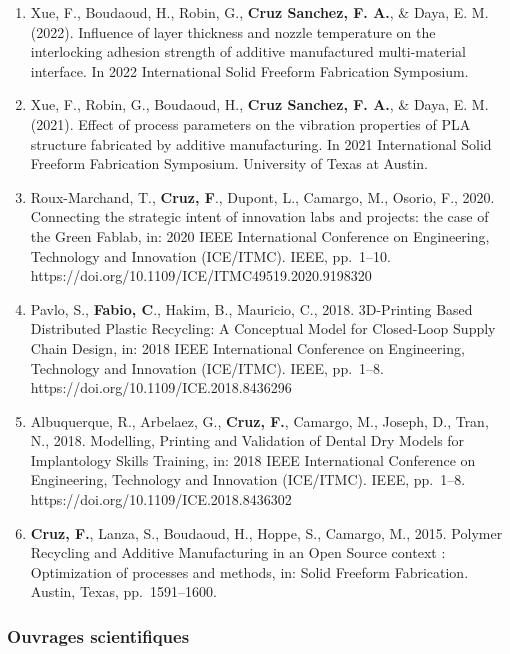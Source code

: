\documentclass[
  11pt,
]{article}
\begin{document}
\begin{enumerate}
\def\labelenumi{\arabic{enumi}.}
\item
  Xue, F., Boudaoud, H., Robin, G., \textbf{Cruz Sanchez, F. A.}, \&
  Daya, E. M. (2022). Influence of layer thickness and nozzle
  temperature on the interlocking adhesion strength of additive
  manufactured multi-material interface. In 2022 International Solid
  Freeform Fabrication Symposium.
\item
  Xue, F., Robin, G., Boudaoud, H., \textbf{Cruz Sanchez, F. A.}, \&
  Daya, E. M. (2021). Effect of process parameters on the vibration
  properties of PLA structure fabricated by additive manufacturing. In
  2021 International Solid Freeform Fabrication Symposium. University of
  Texas at Austin.
\item
  Roux-Marchand, T., \textbf{Cruz, F}., Dupont, L., Camargo, M., Osorio,
  F., 2020. Connecting the strategic intent of innovation labs and
  projects: the case of the Green Fablab, in: 2020 IEEE International
  Conference on Engineering, Technology and Innovation (ICE/ITMC). IEEE,
  pp.~1--10. https://doi.org/10.1109/ICE/ITMC49519.2020.9198320
\item
  Pavlo, S., \textbf{Fabio, C}., Hakim, B., Mauricio, C., 2018.
  3D-Printing Based Distributed Plastic Recycling: A Conceptual Model
  for Closed-Loop Supply Chain Design, in: 2018 IEEE International
  Conference on Engineering, Technology and Innovation (ICE/ITMC). IEEE,
  pp.~1--8. https://doi.org/10.1109/ICE.2018.8436296
\item
  Albuquerque, R., Arbelaez, G., \textbf{Cruz, F.}, Camargo, M., Joseph,
  D., Tran, N., 2018. Modelling, Printing and Validation of Dental Dry
  Models for Implantology Skills Training, in: 2018 IEEE International
  Conference on Engineering, Technology and Innovation (ICE/ITMC). IEEE,
  pp.~1--8. https://doi.org/10.1109/ICE.2018.8436302
\item
  \textbf{Cruz, F.}, Lanza, S., Boudaoud, H., Hoppe, S., Camargo, M.,
  2015. Polymer Recycling and Additive Manufacturing in an Open Source
  context : Optimization of processes and methods, in: Solid Freeform
  Fabrication. Austin, Texas, pp.~1591--1600.
\end{enumerate}

\hypertarget{ouvrages-scientifiques}{%
\subsubsection{Ouvrages scientifiques}\label{ouvrages-scientifiques}}
\end{document}
